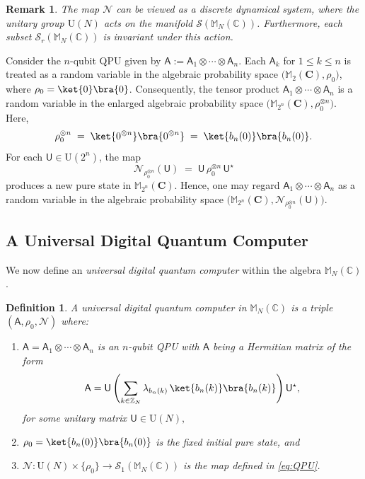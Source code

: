 \documentclass[a4paper,11pt]{article}
\newtheorem{definition}[theorem]{Definition}
\newtheorem{remark}[theorem]{Remark}
\newcommand{\rU}{\mathsf{U}}
\newcommand{\rA}{\mathsf{A}}
\begin{document}
\begin{remark}
The map \(\mathcal{N}\) can be viewed as a discrete dynamical system, where the unitary group \(\mathrm{U}(N)\) acts on the manifold \(\mathcal{S}(\mathbb{M}_N(\mathbb{C}))\). Furthermore, each subset \(\mathcal{S}_r(\mathbb{M}_N(\mathbb{C}))\) is invariant under this action.
\end{remark}


Consider the \(n\)-qubit QPU given by \(\rA := \rA_1 \otimes \cdots \otimes \rA_n\). Each \(\rA_k\) for \(1 \le k \le n\) is treated as a random variable in the algebraic probability space \(\bigl(\mathbb{M}_2(\mathbf{C}), \rho_0\bigr)\), where \(\rho_0 = \ket{0}\bra{0}\). Consequently, the tensor product \(\rA_1 \otimes \cdots \otimes \rA_n\) is a random variable in the enlarged algebraic probability space \(\bigl(\mathbb{M}_{2^n}(\mathbf{C}), \rho_0^{\otimes n}\bigr)\). Here,
\[
\rho_0^{\otimes n} \;=\; \ket{0^{\otimes n}}\bra{0^{\otimes n}} 
\;=\; \ket{b_n(0)}\bra{b_n(0)}.
\]
For each \(\rU \in \mathrm{U}(2^n)\), the map
\[
\mathcal{N}_{\rho_0^{\otimes n}}(\rU) 
\;=\; \rU \,\rho_0^{\otimes n} \,\rU^{\star}
\]
produces a new pure state in \(\mathbb{M}_{2^n}(\mathbf{C})\). Hence, one may regard 
\(\rA_1 \otimes \cdots \otimes \rA_n\) as a random variable in the algebraic probability space 
\(\bigl(\mathbb{M}_{2^n}(\mathbf{C}), \mathcal{N}_{\rho_0^{\otimes n}}(\rU)\bigr)\).

\subsection{A Universal Digital Quantum Computer}

We now define an \emph{universal digital quantum computer} within the algebra \(\mathbb{M}_N(\mathbb{C})\).

\begin{definition}
    A \emph{universal digital quantum computer} in \(\mathbb{M}_N(\mathbb{C})\) is a triple \((\rA, \rho_0, \mathcal{N})\) where:
    \begin{enumerate}
      \item[(a)] \(\rA = \rA_1 \otimes \cdots \otimes \rA_n\) is an $n$-qubit QPU with \(\rA\) being a Hermitian matrix of the form
      \[
      \rA = \rU \left(\sum_{k \in \mathbb{Z}_N} \lambda_{b_n(k)}\, \ket{b_n(k)}\bra{b_n(k)}\right) \rU^{\star},
      \]
      for some unitary matrix  $\rU \in \mathrm{U}(N),$ 
      \item[(b)]\(\rho_0 = \ket{b_n(0)}\bra{b_n(0)}\) is the fixed initial pure state, and
      \item[(c)] \(\mathcal{N} : \mathrm{U}(N) \times \{\rho_0\} \to \mathcal{S}_1(\mathbb{M}_N(\mathbb{C}))\) is the map defined in \eqref{eq:QPU}.
    \end{enumerate}
    \end{definition}
\end{document}
